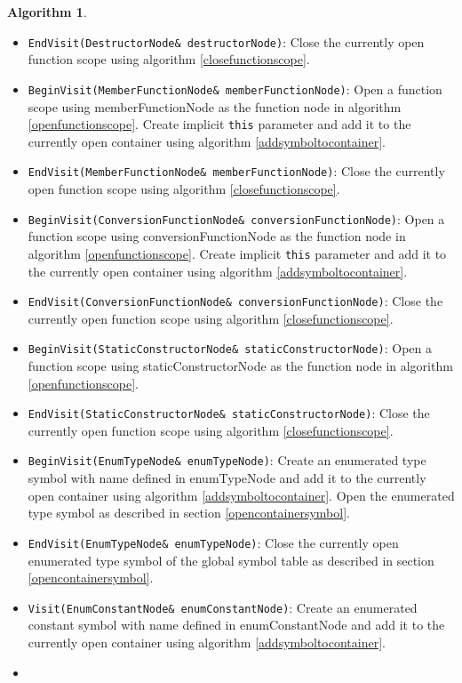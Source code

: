\documentclass[a4paper,oneside,11pt]{book}
\theoremstyle{definition}
\newtheorem{algo}{Algorithm}[section]
\begin{document}
\begin{algo}
\begin{itemize}
Create implicit \verb|this| parameter and add it to the currently open container using algorithm \ref{addsymboltocontainer}.
\item
\verb|EndVisit(DestructorNode& destructorNode)|:
Close the currently open function scope using algorithm \ref{closefunctionscope}.
\item
\verb|BeginVisit(MemberFunctionNode& memberFunctionNode)|:
Open a function scope using memberFunctionNode as the function node in algorithm \ref{openfunctionscope}.
Create implicit \verb|this| parameter and add it to the currently open container using algorithm \ref{addsymboltocontainer}.
\item
\verb|EndVisit(MemberFunctionNode& memberFunctionNode)|:
Close the currently open function scope using algorithm \ref{closefunctionscope}.
\item
\verb|BeginVisit(ConversionFunctionNode& conversionFunctionNode)|:
Open a function scope using conversionFunctionNode as the function node in algorithm \ref{openfunctionscope}.
Create implicit \verb|this| parameter and add it to the currently open container using algorithm \ref{addsymboltocontainer}.
\item
\verb|EndVisit(ConversionFunctionNode& conversionFunctionNode)|:
Close the currently open function scope using algorithm \ref{closefunctionscope}.
\item
\verb|BeginVisit(StaticConstructorNode& staticConstructorNode)|:
Open a function scope using staticConstructorNode as the function node in algorithm \ref{openfunctionscope}.
\item
\verb|EndVisit(StaticConstructorNode& staticConstructorNode)|:
Close the currently open function scope using algorithm \ref{closefunctionscope}.
\item
\verb|BeginVisit(EnumTypeNode& enumTypeNode)|:
Create an enumerated type symbol with name defined in enumTypeNode and
add it to the currently open container using algorithm \ref{addsymboltocontainer}.
Open the enumerated type symbol as described in section \ref{opencontainersymbol}.
\item
\verb|EndVisit(EnumTypeNode& enumTypeNode)|:
Close the currently open enumerated type symbol of the global symbol table as described in section \ref{opencontainersymbol}.
\item
\verb|Visit(EnumConstantNode& enumConstantNode)|:
Create an enumerated constant symbol with name defined in enumConstantNode and
add it to the currently open container using algorithm \ref{addsymboltocontainer}.
\item

\end{itemize}
\end{algo}
\end{document}
